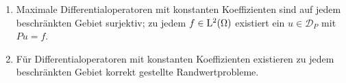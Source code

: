\begin{cor}\label{cor:1:1.10}
\begin{enumerate}
\item
Maximale Differentialoperatoren mit konstanten Koeffizienten sind auf jedem beschränkten Gebiet surjektiv; zu jedem $f\in\mathrm L^2(\Omega)$ existiert ein $u\in\mathcal D_P$ mit $Pu=f$.
\item
Für Differentialoperatoren mit konstanten Koeffizienten existieren
zu jedem beschränkten Gebiet korrekt gestellte Randwertprobleme.
\end{enumerate}
\end{cor}
